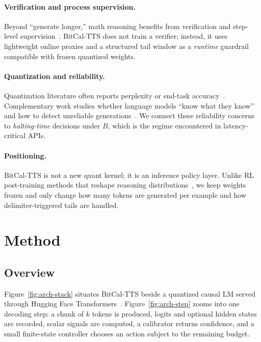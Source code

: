 \documentclass[11pt]{article}
\begin{document}
\paragraph{Verification and process supervision.}
Beyond ``generate longer,'' math reasoning benefits from verification and step-level supervision~\cite{lightman2023letsverify}. BitCal-TTS does not train a verifier; instead, it uses lightweight online proxies and a structured tail window as a \emph{runtime} guardrail compatible with frozen quantized weights.

\paragraph{Quantization and reliability.}
Quantization literature often reports perplexity or end-task accuracy~\cite{dettmers2023qlora}. Complementary work studies whether language models ``know what they know'' and how to detect unreliable generations~\cite{kadavath2022know,manakul2023selfcheckgpt}. We connect these reliability concerns to \emph{halting-time} decisions under $B$, which is the regime encountered in latency-critical APIs.

\paragraph{Positioning.}
BitCal-TTS is not a new quant kernel; it is an inference policy layer. Unlike RL post-training methods that reshape reasoning distributions~\cite{guo2025deepseekr1}, we keep weights frozen and only change how many tokens are generated per example and how delimiter-triggered tails are handled.

\section{Method}
\label{sec:method}

\subsection{Overview}
Figure~\ref{fig:arch-stack} situates BitCal-TTS beside a quantized causal LM served through Hugging Face Transformers~\cite{transformers}. Figure~\ref{fig:arch-step} zooms into one decoding step: a chunk of $k$ tokens is produced, logits and optional hidden states are recorded, scalar signals are computed, a calibrator returns confidence, and a small finite-state controller chooses an action subject to the remaining budget.
\end{document}

